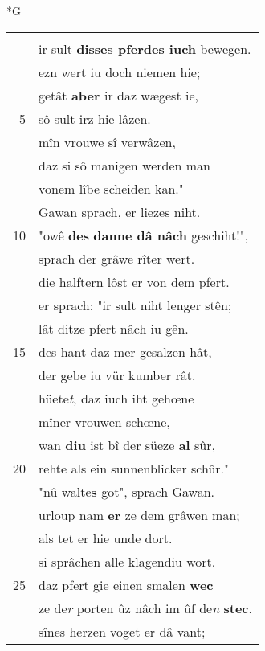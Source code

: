 \documentclass[8pt,a4paper,notitlepage]{article}
\begin{document}
\begin{table}[ht]
\begin{minipage}[t]{0.5\linewidth}
\small
\begin{center}*G
\end{center}
\begin{tabular}{rl}
 & \textbf{\begin{large}E\end{large}r} sprach: "welt ir râtes pflegen,\\ 
 & ir sult \textbf{disses pferdes iuch} bewegen.\\ 
 & ezn wert iu doch niemen hie;\\ 
 & getât \textbf{aber} ir daz wægest ie,\\ 
5 & sô sult irz hie lâzen.\\ 
 & mîn vrouwe sî verwâzen,\\ 
 & daz si sô manigen werden man\\ 
 & vonem lîbe scheiden kan."\\ 
 & Gawan sprach, er liezes niht.\\ 
10 & "owê \textbf{des} \textbf{danne dâ nâch} geschiht!",\\ 
 & sprach der grâwe rîter wert.\\ 
 & die halftern lôst er von dem pfert.\\ 
 & er sprach: "ir sult niht lenger stên;\\ 
 & lât ditze pfert nâch iu gên.\\ 
15 & des hant daz mer gesalzen hât,\\ 
 & der gebe iu vür kumber rât.\\ 
 & hüete\textit{t}, daz iuch iht gehœne\\ 
 & mîner vrouwen schœne,\\ 
 & wan \textbf{diu} ist bî der süeze \textbf{al} sûr,\\ 
20 & rehte als ein sunnenblicker schûr."\\ 
 & "nû walte\textbf{s} got", sprach Gawan.\\ 
 & urloup nam \textbf{er} ze dem grâwen man;\\ 
 & als tet er hie unde dort.\\ 
 & si sprâchen alle klagendiu wort.\\ 
25 & daz pfert gie einen smalen \textbf{wec}\\ 
 & ze de\textit{r} porten ûz nâch im ûf de\textit{n} \textbf{stec}.\\ 
 & sînes herzen voget er dâ vant;\\ 

\end{tabular}
\end{minipage}
\end{table}
\end{document}
